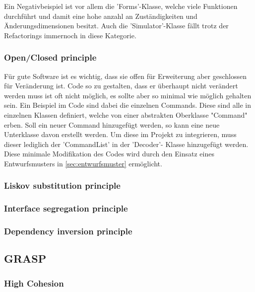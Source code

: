 \documentclass[12pt,a4paper,titlepage,ngerman,pdftex]{report}
\begin{document}
    Ein Negativbeispiel ist vor allem die 'Forms'-Klasse, welche viele Funktionen durchführt und damit eine hohe anzahl an Zuständigkeiten und Änderungsdimensionen besitzt. Auch die 'Simulator'-Klasse fällt trotz der Refactorings immernoch in diese Kategorie. 



    \subsubsection{Open/Closed principle}
    Für gute Software ist es wichtig, dass sie offen für Erweiterung aber geschlossen für Veränderung ist. Code so zu gestalten, dass er überhaupt nicht verändert werden muss ist oft nicht möglich, es sollte aber so minimal wie möglich gehalten sein. Ein Beispiel im Code sind dabei die einzelnen Commands.
    Diese sind alle in einzelnen Klassen definiert, welche von einer abstrakten Oberklasse "Command" erben. Soll ein neuer Command hinzugefügt werden, so kann eine neue Unterklasse davon erstellt werden. Um diese im Projekt zu integrieren, muss dieser lediglich der 'CommandList' in der 'Decoder'- Klasse hinzugefügt werden.
    Diese minimale Modifikation des Codes wird durch den Einsatz eines Entwurfsmusters in \autoref{sec:entwurfsmuster} ermöglicht. 

    \subsubsection{Liskov substitution principle}

    \subsubsection{Interface segregation principle}

    \subsubsection{Dependency inversion principle}

    \subsection{GRASP}

    \subsubsection{High Cohesion}
\end{document}
